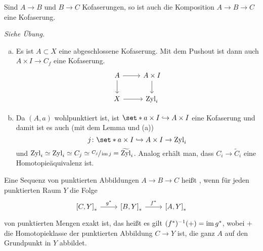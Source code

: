 \begin{lemma}[{name=[Komposition von Kofaserungen]}]
	Sind $A \to B$ und $B \to C$ Kofaserungen, so ist auch die Komposition $A \to B \to C$ eine Kofaserung.
\end{lemma}
\begin{beweis}
	\emph{Siehe Übung.}
\end{beweis}

\begin{beweis}[name={von \cref{satz:abg-kofaserung}}]
	\begin{enumerate}[(a)]
		\item Es ist $A \subset X$ eine abgeschlossene Kofaserung.
		Mit dem Pushout ist dann auch $A \times I \to C_f$ eine Kofaserung.
		\[
			\begin{tikzcd}
				A \rar \dar & A \times I \dar\\
				X \rar & \Zyl_i
			\end{tikzcd}
		\]
		\item Da $(A,a)$ wohlpunktiert ist, ist $\set*{a} \times I \hookrightarrow A \times I$ eine Kofaserung und damit ist es auch (mit dem Lemma und (a))
		\[
			j \colon \set*{a} \times I \hookrightarrow A \times I \rightarrow \Zyl_i
		\]
		und $\operatorname{Zyl}_i \simeq \operatorname{Zyl}_i \simeq C_j \simeq \sfrac{C_j}{\operatorname{im} j} = \widetilde{\operatorname{Zyl}}_i$.
		Analog erhält man, dass $C_i \to \tilde{C}_i$ eine Homotopieäquivalenz ist.\qedhere
	\end{enumerate}
\end{beweis}

\begin{definition}[{name=[koexakte Folge punktierter Abbildunge]}]
	Eine Sequenz von punktierten Abbildungen $A \to B \to C$ heißt , wenn für jeden punktierten Raum $Y$ die Folge 
	\[
		\begin{tikzcd}
			\benbrace*{C,Y}_* \rar["g^*"] & \benbrace*{B,Y}_* \rar["f^*"] & \benbrace*{A,Y}_*
		\end{tikzcd}
	\] 
	von punktierten Mengen exakt ist, das heißt es gilt $(f^*)^{-1}(+) = \operatorname{im} g^*$, wobei $+$ die Homotopieklasse der punktierten Abbildung $C\to Y$ ist, die ganz $A$ auf den Grundpunkt in $Y$ abbildet.
\end{definition}

